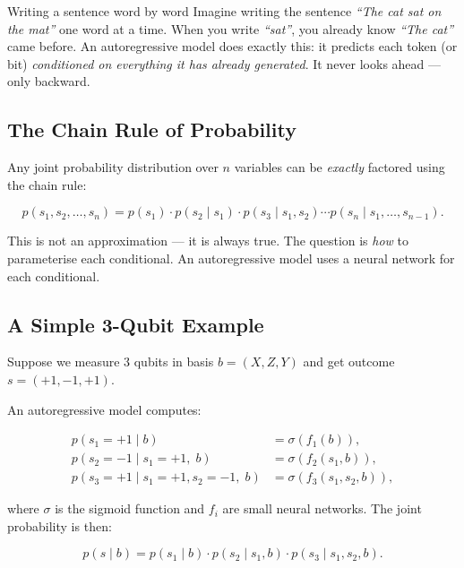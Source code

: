 \documentclass[11pt, a4paper]{article}
\begin{document}
\begin{analogybox}{Writing a sentence word by word}
Imagine writing the sentence \textit{``The cat sat on the mat''} one word at
a time. When you write \textit{``sat''}, you already know \textit{``The cat''}
came before. An autoregressive model does exactly this: it predicts each
token (or bit) \emph{conditioned on everything it has already generated}.
It never looks ahead — only backward.
\end{analogybox}

\subsection{The Chain Rule of Probability}

Any joint probability distribution over $n$ variables can be \emph{exactly}
factored using the chain rule:

\begin{equation}
  p(s_1, s_2, \ldots, s_n) =
  p(s_1)\cdot
  p(s_2 \mid s_1)\cdot
  p(s_3 \mid s_1, s_2)\cdots
  p(s_n \mid s_1, \ldots, s_{n-1}).
\end{equation}

This is not an approximation — it is always true. The question is
\emph{how} to parameterise each conditional. An autoregressive model uses a
neural network for each conditional.

\subsection{A Simple 3-Qubit Example}

Suppose we measure 3 qubits in basis $b = (X, Z, Y)$ and get outcome
$s = (+1, -1, +1)$.

An autoregressive model computes:

\begin{align}
  p(s_1 = +1 \mid b)                     &= \sigma(f_1(b)),\\
  p(s_2 = -1 \mid s_1 = +1,\; b)        &= \sigma(f_2(s_1, b)),\\
  p(s_3 = +1 \mid s_1 = +1, s_2 = -1,\; b) &= \sigma(f_3(s_1, s_2, b)),
\end{align}

where $\sigma$ is the sigmoid function and $f_i$ are small neural networks.
The joint probability is then:

\begin{equation}
  p(s \mid b) = p(s_1 \mid b)\cdot p(s_2 \mid s_1, b)\cdot p(s_3 \mid s_1, s_2, b).
\end{equation}
\end{document}
